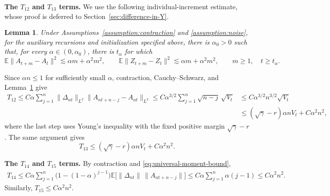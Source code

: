 \documentclass[11pt,letterpaper]{article}
\theoremstyle{plain}
\newtheorem{lemma}{Lemma}
\theoremstyle{definition}
\theoremstyle{remark}
\newcommand{\E}{\mathbb{E}}
\begin{document}
\noindent\textbf{The \(T_{12}\) and \(T_{13}\) terms.}
We use the following individual-increment estimate, whose proof is deferred
to Section~\ref{sec:difference-in-Y}.
\begin{lemma}\label{lem:difference-in-Y}
Under Assumptions~\ref{assumption:contraction} and \ref{assumption:noise},
for the auxiliary recursions and initialization specified above, there is
\(\alpha_0>0\) such that, for every \(\alpha\in(0,\alpha_0)\), there is
\(t_\alpha\) for which
\[
    \E\|A_{t+m}-A_t\|^2\lesssim\alpha m+\alpha^2m^2,
    \qquad
    \E\|Z_{t+m}-Z_t\|^2\lesssim\alpha m+\alpha^2m^2,
    \qquad m\geq1,\quad t\geq t_\alpha.
\]
\end{lemma}
Since \(\alpha n\leq1\) for sufficiently small \(\alpha\), contraction,
Cauchy--Schwarz, and Lemma~\ref{lem:difference-in-Y} give
\begin{align*}
    T_{12}
    \leq C\alpha\sum_{j=1}^n
        \|\Delta_{nt}\|_{L^2}\|A_{nt+n-j}-A_{nt}\|_{L^2}\leq C\alpha^{3/2}\sum_{j=1}^n\sqrt{n-j}\,\sqrt{V_t}
    &\leq C\alpha^{3/2}n^{3/2}\sqrt{V_t}\\
    &\leq(\sqrt\gamma-r)\alpha nV_t+C\alpha^2n^2,
\end{align*}
where the last step uses Young's inequality with the fixed positive
margin \(\sqrt\gamma-r\). The same argument gives
\[
    T_{13}\leq(\sqrt\gamma-r)\alpha nV_t+C\alpha^2n^2.
\]

\noindent\textbf{The \(T_{14}\) and \(T_{15}\) terms.}
By contraction and \eqref{eq:universal-moment-bound},
\begin{align*}
    T_{14}
    \leq C\alpha\sum_{j=1}^n
        \bigl(1-(1-\alpha)^{j-1}\bigr)
        \E\bigl[\|\Delta_{nt}\|\,\|A_{nt+n-j}\|\bigr]\leq C\alpha\sum_{j=1}^n\alpha(j-1)
    \leq C\alpha^2n^2.
\end{align*}
Similarly, \(T_{15}\leq C\alpha^2n^2\).
\end{document}
